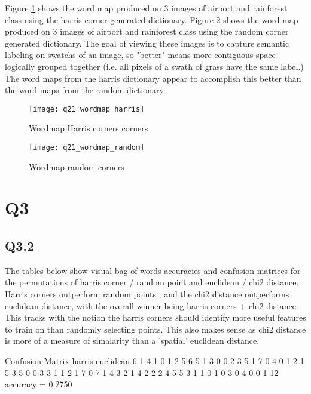 \documentclass[12pt]{article}
\begin{document}
Figure \ref{fig:wordmapharris} shows the word map produced on 3 images of airport and rainforest class using the harris corner generated dictionary.
Figure \ref{fig:wordmaprandom} shows the word map produced on 3 images of airport and rainforest class using the random corner generated dictionary.
The goal of viewing these images is to capture semantic labeling on swatchs of an image, so "better" means more contiguous space logically grouped together (i.e. all pixels of a swath of grass have the same label.) The word maps from the harris dictionary appear to accomplish this better than the word maps from the random dictionary.

\begin{figure}[H]
\centering
\texttt{[image: q21\_wordmap\_harris]}
\caption{Wordmap Harris corners corners}    
\label{fig:wordmapharris}
\end{figure}   


\begin{figure}[H]
\centering
\texttt{[image: q21\_wordmap\_random]}
\caption{Wordmap random corners}    
\label{fig:wordmaprandom}
\end{figure}   

\newpage
\section{Q3}
\subsection{Q3.2}

The tables below show visual bag of words accuracies and confusion matrices for the permutations of harris corner / random point and euclidean / chi2 distance.  Harris corners outperform random points , and the chi2 distance outperforms euclidean distance, with the overall winner being harris corners + chi2 distance. This tracks with the notion the harris corners should identify more useful features to train on than randomly selecting points. This also makes sense as chi2 distance is more of a measure of simalarity than a 'spatial' euclidean distance.

Confusion Matrix harris euclidean 
     6     1     4     1     0     1     2     5
     6     5     1     3     0     0     2     3
     5     1     7     0     4     0     1     2
     1     5     3     5     0     0     3     3
     1     1     2     1     7     0     7     1
     4     3     2     1     4     2     2     2
     4     5     5     3     1     1     0     1
     0     3     0     4     0     0     1    12
accuracy =
    0.2750
\end{document}
